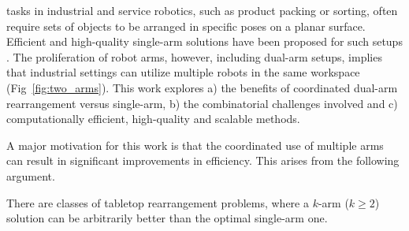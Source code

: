 
 tasks in industrial and service robotics, such as product packing or sorting, often require sets of objects to be arranged in
specific poses on a planar surface. Efficient and high-quality
single-arm solutions have been proposed for such
setups \cite{193}. The proliferation of robot arms, however, including dual-arm setups, implies that industrial settings can utilize multiple robots in the same workspace (Fig~\ref{fig:two_arms}). This work explores a) the benefits of coordinated dual-arm rearrangement versus single-arm, b) the combinatorial challenges involved and c) computationally efficient, high-quality and scalable methods.

 


A major motivation for this work is that the coordinated use of multiple arms can
result in significant improvements in efficiency. This arises from the following argument.

\begin{observation}\label{l:k-arm-lower-bound}
There are classes of tabletop rearrangement problems, where a $k$-arm
($k \ge 2$) solution can be arbitrarily better than the optimal
single-arm one.
\end{observation}

